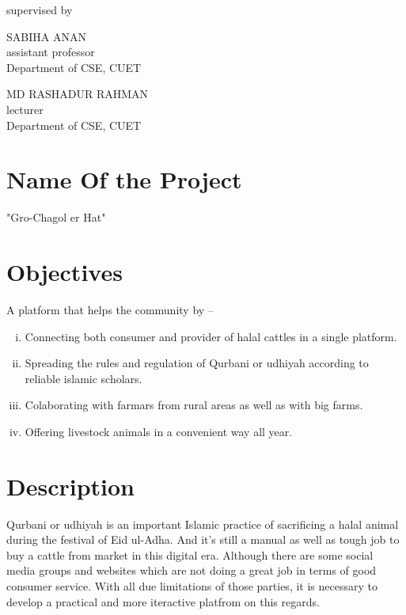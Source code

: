 \documentclass[a4paper,12pt]{report}
\begin{document}
\begin{titlepage}
	\vspace{0.5cm}
	supervised by

	\parbox[l]{8cm}{\begin{center}

			SABIHA ANAN\\
			\footnotesize{assistant professor\\
				Department of CSE, CUET}
		\end{center}
	}
	\parbox[r]{8cm}{\begin{center}

			MD RASHADUR RAHMAN\\
			\footnotesize{lecturer \\
				Department of CSE, CUET}
		\end{center}
	}

	\vfill
\end{titlepage}


\onehalfspacing

\section*{Name Of the Project}
"Gro-Chagol er Hat"
\section*{Objectives}
A platform that helps the community by --
\begin{enumerate}[i.]
	\item Connecting both consumer and provider of halal cattles in a single platform.
	\item Spreading the rules and regulation of Qurbani or udhiyah according to reliable islamic scholars.
	\item Colaborating with farmars from rural areas as well as with big farms.
\item Offering livestock animals in a convenient way all year.
\end{enumerate}
\section*{Description}
Qurbani or udhiyah is an important Islamic practice of sacrificing a halal animal during the festival of Eid ul-Adha. And it's still a manual as well as tough job to buy a cattle from market in this digital era. Although there are some social media groups and websites which are not doing a great job in terms of good consumer service. With all due limitations of those parties, it is necessary to develop a practical and more iteractive platfrom on this regards.
\end{document}
